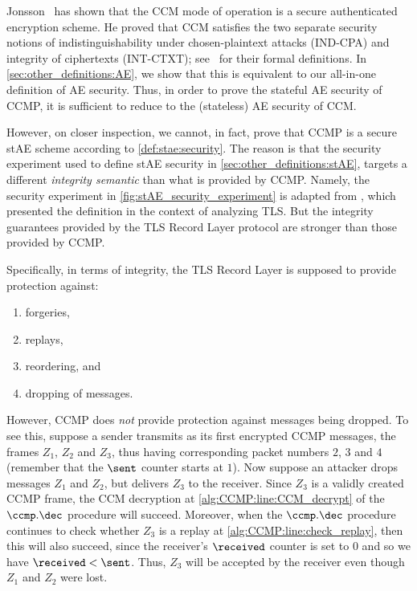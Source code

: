 Jonsson~\cite{SAC:Jonsson02} has shown that the CCM mode of operation is a secure authenticated encryption scheme.
He proved that CCM satisfies the two separate security notions of indistinguishability under chosen-plaintext attacks (IND-CPA) and integrity of ciphertexts (INT-CTXT);
see~\cite{AC:BelNam00} for their formal definitions.
In \cref{sec:other_definitions:AE},
we show that this is equivalent to our all-in-one definition of AE security.
Thus,
in order to prove the stateful AE security of CCMP,
it is sufficient to reduce to the (stateless) AE security of CCM. 

However,
on closer inspection,
we cannot,
in fact,
prove that CCMP is a secure stAE scheme according to \cref{def:stae:security}. 
The reason is that the security experiment used to define stAE security in \cref{sec:other_definitions:stAE},
targets a different \emph{integrity semantic} than what is provided by CCMP.
Namely,
the security experiment in \cref{fig:stAE_security_experiment} is adapted from \cite{C:JKSS12},
which presented the definition in the context of analyzing TLS.
But the integrity guarantees provided by the TLS Record Layer protocol are stronger than those provided by CCMP.

Specifically,
in terms of integrity,
the TLS Record Layer is supposed to provide protection against: 
\begin{enumerate}
	\item forgeries,
	
	\item replays,
	
	\item reordering, and
	
	\item dropping of messages.
\end{enumerate} 

However,
CCMP does \emph{not} provide protection against messages being dropped.
To see this,
suppose a sender transmits as its first encrypted CCMP messages,
the frames $Z_1$, $Z_2$ and $Z_3$,
thus having corresponding packet numbers $2$, $3$ and $4$
(remember that the $\sent$ counter starts at $1$).
Now suppose an attacker drops messages $Z_1$ and $Z_2$,
but delivers $Z_3$ to the receiver.
Since $Z_3$ is a validly created CCMP frame,
the CCM decryption at \cref{alg:CCMP:line:CCM_decrypt} of the $\ccmp.\dec$ procedure  will succeed.
Moreover,
when the $\ccmp.\dec$ procedure continues to check whether $Z_3$ is a replay at \cref{alg:CCMP:line:check_replay},
then this will also succeed,
since the receiver's $\received$ counter is set to $0$ and so we have $\received < \sent$.
Thus,
$Z_3$ will be accepted by the receiver even though $Z_1$ and $Z_2$ were lost.


